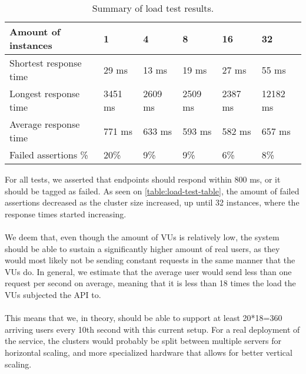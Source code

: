 \begin{table}[]
    \begin{tabular}{|l|l|l|l|l|l|}
    \hline
    \textbf{Amount of instances} & \textbf{1} & \textbf{4} & \textbf{8} & \textbf{16} & \textbf{32} \\ \hline
    Shortest response time       & 29 ms      & 13 ms      & 19 ms      & 27 ms       & 55 ms       \\ \hline
    Longest response time        & 3451 ms    & 2609 ms    & 2509 ms    & 2387 ms     & 12182 ms    \\ \hline
    Average response time        & 771 ms     & 633 ms     & 593 ms     & 582 ms      & 657 ms      \\ \hline
    Failed assertions \%         & 20\%       & 9\%        & 9\%        & 6\%         & 8\%         \\ \hline
    \end{tabular}
    \caption{Summary of load test results.}
    \label{table:load-test-table}
\end{table}
For all tests, we asserted that endpoints should respond within 800 ms, or it should be tagged as failed.
As seen on \autoref{table:load-test-table}, the amount of failed assertions decreased as the cluster size increased, up until 32 instances, where the response times started increasing.
\\\\
We deem that, even though the amount of VUs is relatively low, the system should be able to sustain a significantly higher amount of real users, as they would most likely not be sending constant requests in the same manner that the VUs do.
In general, we estimate that the average user would send less than one request per second on average, meaning that it is less than 18 times the load the VUs subjected the API to.
\\\\
This means that we, in theory, should be able to support at least 20*18=360 arriving users every 10th second with this current setup.
For a real deployment of the service, the clusters would probably be split between multiple servers for horizontal scaling, and more specialized hardware that allows for better vertical scaling.
